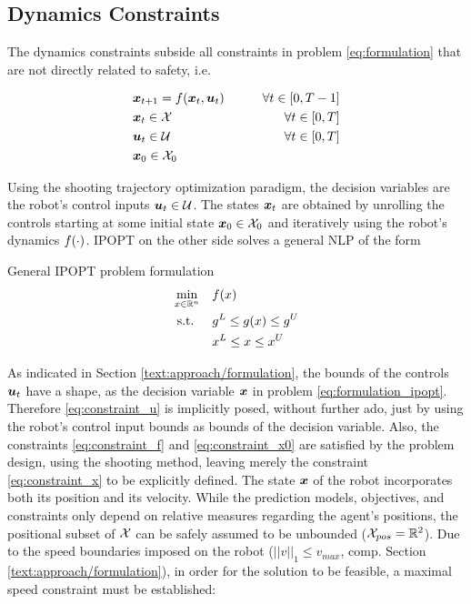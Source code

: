 \subsection{Dynamics Constraints}
\label{text:approach/constraint/dynamics}
The dynamics constraints subside all constraints in problem \ref{eq:formulation} that are not directly related to safety, i.e. 

\begin{align}
\label{eq:constraint_f}
&\boldsymbol{x}_{t+1} = f(\boldsymbol{x}_t, \boldsymbol{u}_t) \qquad& \forall t \in [0, T - 1] \\
\label{eq:constraint_x}
&\boldsymbol{x}_t \in \mathcal{X} & \forall t \in [0, T]\\
\label{eq:constraint_u}
&\boldsymbol{u}_t \in \mathcal{U} & \forall t \in [0, T]\\
\label{eq:constraint_x0}
&\boldsymbol{x}_0 \in \mathcal{X}_0
\end{align}

Using the shooting trajectory optimization paradigm, the decision variables are the robot's control inputs $\boldsymbol{u}_t \in \mathcal{U}$. The states $\boldsymbol{x}_t$ are obtained by unrolling the controls starting at some initial state $\boldsymbol{x}_0 \in \mathcal{X}_0$ and iteratively using the robot's dynamics $f(\cdot)$. \ac{IPOPT} on the other side solves a general \ac{NLP} of the form \cite{Wachter2006} \\

\begin{problem}{General IPOPT problem formulation}
\begin{align}
\min_{x \in \mathbb{R}^n} \quad & f(x) \\
\textrm{s.t. } \quad & g^L \leq g(x) \leq g^U \\
& x^L \leq x \leq x^U 
\end{align}
\label{eq:formulation_ipopt}
\end{problem}

As indicated in Section \ref{text:approach/formulation}, the bounds of the controls $\boldsymbol{u}_t$ have a shape, as the decision variable $\boldsymbol{x}$ in problem \ref{eq:formulation_ipopt}. Therefore \ref{eq:constraint_u} is implicitly posed, without further ado, just by using the robot's control input bounds as bounds of the decision variable. Also, the constraints \ref{eq:constraint_f} and  \ref{eq:constraint_x0} are satisfied by the problem design, using the shooting method, leaving merely the constraint \ref{eq:constraint_x} to be explicitly defined. The state $\boldsymbol{x}$ of the robot incorporates both its position and its velocity. While the prediction models, objectives, and constraints only depend on relative measures regarding the agent's positions, the positional subset of $\mathcal{X}$ can be safely assumed to be unbounded ($\mathcal{X}_{pos} = \mathbb{R}^2$). Due to the speed boundaries imposed on the robot ($||v||_1 \leq v_{max}$, comp. Section \ref{text:approach/formulation}), in order for the solution to be feasible, a maximal speed constraint must be established:

